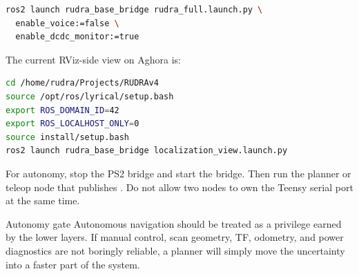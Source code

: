 \begin{lstlisting}[language=bash]
ros2 launch rudra_base_bridge rudra_full.launch.py \
  enable_voice:=false \
  enable_dcdc_monitor:=true
\end{lstlisting}

The current RViz-side view on Aghora is:

\begin{lstlisting}[language=bash]
cd /home/rudra/Projects/RUDRAv4
source /opt/ros/lyrical/setup.bash
export ROS_DOMAIN_ID=42
export ROS_LOCALHOST_ONLY=0
source install/setup.bash
ros2 launch rudra_base_bridge localization_view.launch.py
\end{lstlisting}

For autonomy, stop the PS2 bridge and start the  bridge. Then run the
planner or teleop node that publishes . Do not allow two nodes to own
the Teensy serial port at the same time.

\begin{safetybox}{Autonomy gate}
Autonomous navigation should be treated as a privilege earned by the lower layers. If
manual control, scan geometry, TF, odometry, and power diagnostics are not boringly
reliable, a planner will simply move the uncertainty into a faster part of the system.
\end{safetybox}
